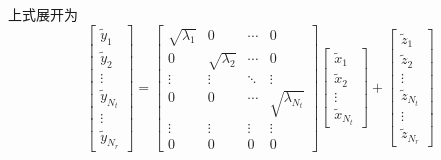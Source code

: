 上式展开为
\begin{equation}
\left[
    \begin{matrix}
        \tilde{y}_1 \\
        \tilde{y}_2 \\
        \vdots \\
        \tilde{y}_{N_t} \\
        \vdots \\
        \tilde{y}_{N_r}
    \end{matrix}
\right]
=\left[ 
\begin{matrix}
    \sqrt{\lambda_1} & 0 & \cdots & 0 \\
    0 & \sqrt{\lambda_2} & \cdots & 0 \\
    \vdots & \vdots & \ddots & \vdots \\
    0 & 0 & \cdots & \sqrt{\lambda_{N_t}} \\
    \vdots & \vdots & \vdots & \vdots \\
    0 & 0 & 0 & 0
\end{matrix}
\right]
\left[
\begin{matrix}
    \tilde{x}_1 \\
    \tilde{x}_2 \\
    \vdots \\
    \tilde{x}_{N_t}
    \end{matrix}
    \right] + 
    \left[
\begin{matrix}
    \tilde{z}_1 \\
    \tilde{z}_2 \\
    \vdots \\
    \tilde{z}_{N_t} \\
    \vdots \\
    \tilde{z}_{N_r}
\end{matrix}
\right]
\end{equation}


